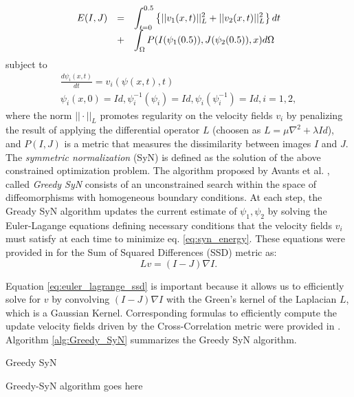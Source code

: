 \begin{equation}\label{eq:syn_energy}
    \begin{array}{lll}
        E(I, J) &=& \mathlarger{\int_{t=0}^{0.5} \left\lbrace ||v_{1}(x, t)||_{L}^{2} + ||v_{2}(x, t)||_{L}^{2}  \right\rbrace dt}\\
        &+&\mathlarger{ \int_{\Omega} P(I(\psi_{1}(0.5)), J(\psi_{2}(0.5)), x) d\Omega}
    \end{array}
\end{equation}
subject to
\begin{displaymath}
    \begin{array}{l}
        \frac{d\psi_{i}(x, t)}{dt} = v_{i}(\psi(x,t),t)\\
        \psi_{i}(x, 0) = Id, \psi_{i}^{-1}(\psi_{i}) = Id, \psi_{i}(\psi_{i}^{-1}) = Id, i=1,2,
    \end{array}
\end{displaymath}
where the norm $||\cdot||_{L}$ promotes regularity on the velocity fields $v_{i}$ by penalizing the result of applying the differential operator $L$ (choosen as
$L = \mu \nabla^{2} + \lambda Id$), and $P(I, J)$ is a metric
that measures the dissimilarity between images $I$ and $J$. The {\it symmetric normalization} (SyN) is defined as the solution of the above constrained optimization problem.
The algorithm proposed by Avants et al. \cite{Avants2009}, called {\it Greedy SyN} consists of an unconstrained search within the space of diffeomorphisms with homogeneous boundary
conditions. At each step, the Gready SyN algorithm updates the current estimate of $\psi_{1}, \psi_{2}$ by solving the Euler-Lagange equations defining necessary conditions
that the velocity fields $v_{i}$ must satisfy at each time to minimize eq. \ref{eq:syn_energy}. These equations were provided in \cite{Avants2006} for the Sum of Squared
Differences (SSD) metric as:
\begin{equation}\label{eq:euler_lagrange_ssd}
    Lv = (I - J)\nabla I.
\end{equation}

Equation \ref{eq:euler_lagrange_ssd} is important because it allows us to efficiently solve for $v$ by convolving $(I - J)\nabla I$ with the Green's kernel of the Laplacian $L$, which
is a Gaussian Kernel. Corresponding formulas to efficiently compute the update velocity fields driven by the Cross-Correlation metric were provided in \cite{Avants2009}.
Algorithm \ref{alg:Greedy_SyN} summarizes the Greedy SyN algorithm.

\begin{algorithm}[h!]
\caption{Greedy SyN}\label{alg:Greedy_SyN}
\begin{algorithmic}[1]
\STATE Greedy-SyN algorithm goes here
\end{algorithmic}
\end{algorithm}
